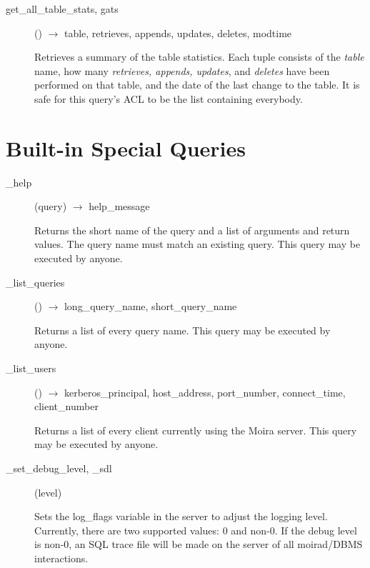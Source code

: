\begin{description}
\item[get\_all\_table\_stats, gats]() $\rightarrow$ table, retrieves, appends, updates,
deletes, modtime

Retrieves a summary of the table statistics.  Each tuple consists of
the {\em table} name, how many {\em retrieves, appends, updates}, and
{\em deletes} have been performed on that table, and the date of the
last change to the table.  It is safe for this query's ACL to be the
list containing everybody.

\end{description}

\section{Built-in Special Queries}

\begin{description}

\item[\_help](query) $\rightarrow$ help\_message

Returns the short name of the query and a list of arguments and return
values.  The query name must match an existing query.  This query may
be executed by anyone.

\item[\_list\_queries]() $\rightarrow$ long\_query\_name, short\_query\_name

Returns a list of every query name.  This query may be executed by
anyone.

\item[\_list\_users]() $\rightarrow$ kerberos\_principal, host\_address,
port\_number, connect\_time, client\_number

Returns a list of every client currently using the Moira server.  This
query may be executed by anyone.

\item[\_set\_debug\_level, \_sdl](level)

Sets the log\_flags variable in the server to adjust the logging level.
Currently, there are two supported values: 0 and non-0. If the debug
level is non-0, an SQL trace file will be made on the server of all
moirad/DBMS interactions.

\end{description}


